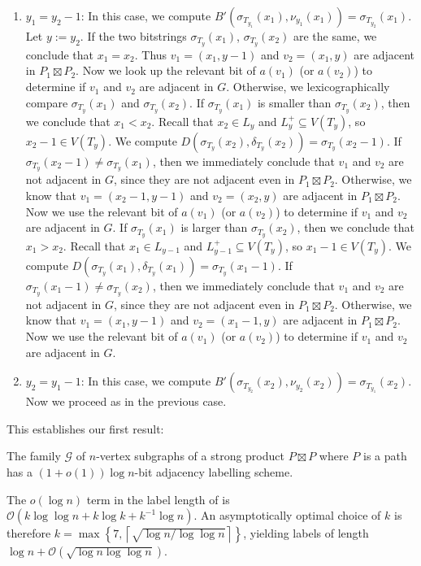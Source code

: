\documentclass[kpfonts]{patmorin}
\newcommand{\Oh}{\mathcal{O}}
\begin{document}
\begin{enumerate}
  \item $y_1=y_2-1$:
  In this case, we compute $B'(\sigma_{T_{y_1}}(x_1), \nu_{y_1}(x_1))=\sigma_{T_{y_2}}(x_1)$.
  Let $y:=y_2$.
  If the two bitstrings $\sigma_{T_y}(x_1)$, $\sigma_{T_y}(x_2)$ are the same,
  we conclude that $x_1=x_2$. Thus $v_1=(x_1,y-1)$ and $v_2=(x_1,y)$ are adjacent in $P_1\boxtimes P_2$.
  Now we look up the relevant bit of $a(v_1)$ (or $a(v_2)$) to determine
  if $v_1$ and $v_2$ are adjacent in $G$.
  Otherwise, we lexicographically compare $\sigma_{T_y}(x_1)$ and $\sigma_{T_y}(x_2)$.
  If $\sigma_{T_y}(x_1)$ is smaller than $\sigma_{T_y}(x_2)$, then we conclude that $x_1<x_2$. 
  Recall that $x_2 \in L_y$ and $L^+_y\subseteq V(T_y)$, so $x_2-1 \in V(T_y)$.
  We compute $D(\sigma_{T_y}(x_2),\delta_{T_y}(x_2))=\sigma_{T_y}(x_2-1)$.
  If $\sigma_{T_y}(x_2-1)\neq \sigma_{T_y}(x_1)$, then we immediately conclude that $v_1$ and $v_2$ are not adjacent in $G$, since they are not adjacent even in $P_1\boxtimes P_2$.  Otherwise, we know that
  $v_1=(x_2-1,y-1)$ and $v_2=(x_2,y)$ are adjacent in $P_1\boxtimes P_2$.
  Now we use the relevant bit of $a(v_1)$ (or $a(v_2)$) to determine if $v_1$ and $v_2$ are adjacent in $G$.
  If $\sigma_{T_y}(x_1)$ is larger than $\sigma_{T_y}(x_2)$, then we conclude that $x_1>x_2$.
  Recall that $x_1 \in L_{y-1}$ and $L^+_{y-1}\subseteq V(T_y)$, so $x_1-1 \in V(T_y)$. 
  We compute $D(\sigma_{T_{y}}(x_1),\delta_{T_{y}}(x_1))=\sigma_{T_y}(x_1-1)$.
  If $\sigma_{T_y}(x_1-1)\neq \sigma_{T_y}(x_2)$, then we immediately conclude that $v_1$ and $v_2$ are not adjacent in $G$, since they are not adjacent even in $P_1\boxtimes P_2$. 
  Otherwise, we know that
  $v_1=(x_1,y-1)$ and $v_2=(x_1-1,y)$ are adjacent in $P_1\boxtimes P_2$.
  Now we use the relevant bit of $a(v_1)$ (or $a(v_2)$) to determine if $v_1$ and $v_2$ are adjacent in $G$.
  \item $y_2=y_1-1$: In this case, we compute $B'(\sigma_{T_{y_2}}(x_2),\nu_{y_2}(x_2))=\sigma_{T_{y_1}}(x_2)$.  Now we proceed as in the previous case.
\end{enumerate}

This establishes our first result:

\begin{thm}
  The family $\mathcal{G}$ of $n$-vertex subgraphs of a strong product $P\boxtimes P$ where $P$ is a path has a $(1+o(1))\log n$-bit adjacency labelling scheme.
\end{thm}

\begin{rem}
  The $o(\log n)$ term in the label length of  is $\Oh(k\log\log n + k \log k + k^{-1}\log n)$.  An asymptotically optimal choice of $k$ is therefore $k=\max\left\{7,\left\lceil\sqrt{\log n / \log\log n}\right\rceil\right\}$, yielding labels of length $\log n + \Oh\left(\sqrt{\log n\log\log n}\right)$.
\end{rem}
\end{document}
